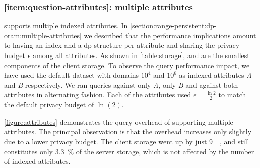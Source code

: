 		\subsubsection*{\textbf{\texorpdfstring{\ref{item:question-attributes}:}{} multiple attributes}}

			

			\epsolute{} supports multiple indexed attributes.
			In \cref{section:range-persistent:dp-oram:multiple-attributes} we described that the performance implications amount to having an index \indexI{} and a \acrshort{dp} structure \serverDS{} per attribute and sharing the privacy budget $\epsilon$ among all attributes.
			As shown in \cref{table:storage}, \indexI{} and \serverDS{} are the smallest components of the client storage.
			To observe the query performance impact, we have used the default dataset with domains $10^4$ and $10^6$ as indexed attributes \emph{A} and \emph{B} respectively.
			We ran queries against only \emph{A}, only \emph{B} and against both attributes in alternating fashion.
			Each of the attributes used $\epsilon = \frac{\ln{2}}{2}$ to match the default privacy budget of $\ln(2)$.

			\cref{figure:attributes} demonstrates the query overhead of supporting multiple attributes.
			The principal observation is that the overhead increases only slightly due to a lower privacy budget.
			The client storage went up by just \SI{9}{\mega\byte}, and still constitutes only \SI{3.3}{\percent} of the server storage, which is not affected by the number of indexed attributes.

